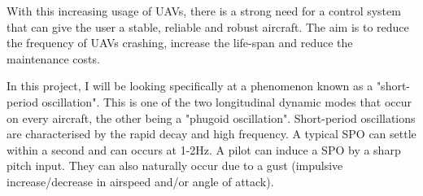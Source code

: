 \documentclass[
11pt, %
english, %
singlespacing, %
headsepline, %
]{MastersDoctoralThesis} %
\begin{document}
With this increasing usage of UAVs, there is a strong need for a control system that can give the user a stable, reliable and robust aircraft. The aim is to reduce the frequency of UAVs crashing, increase the life-span and reduce the maintenance costs. 

In this project, I will be looking specifically at a phenomenon known as a "short-period oscillation". This is one of the two longitudinal dynamic modes that occur on every aircraft, the other being a "phugoid oscillation". Short-period oscillations are characterised by the rapid decay and high frequency. A typical SPO can settle within a second and can occurs at 1-2Hz. A pilot can induce a SPO by a sharp pitch input. They can also naturally occur due to a gust (impulsive increase/decrease in airspeed and/or angle of attack). 
\end{document}
